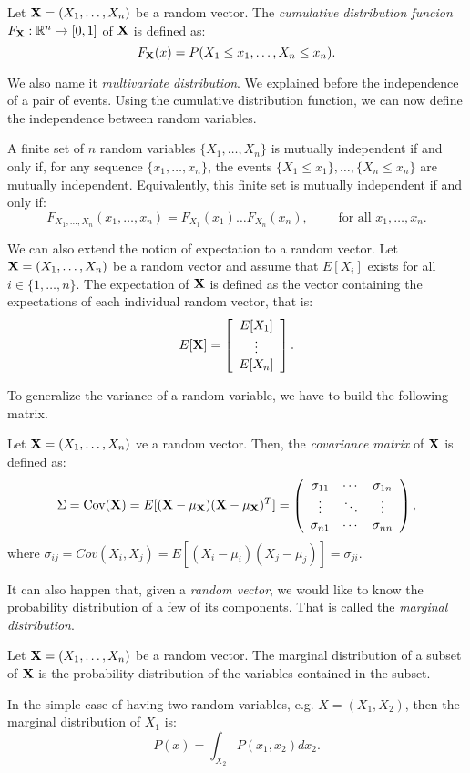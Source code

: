 \begin{ndef}
Let $\mathbf{X} = (X_1,\dots,X_n)$ be a random vector. The \emph{cumulative distribution funcion} $F_{\mathbf{X}} : \mathbb{R}^n \to [0,1]$ of $\mathbf{X}$ is defined as:
$$
F_{\mathbf{X}}(x) = P(X_1 \leq x_1 , \dots, X_n \leq x_n).
$$
\end{ndef}

We also name it \emph{multivariate distribution}.  We explained before the independence of a pair of events. Using the cumulative distribution function, we can now define the independence between random variables.
\begin{ndef}
A finite set of $n$ random variables $\{X_1,\dots,X_n\}$ is mutually independent if and only if, for any sequence $\{x_1,\dots,x_n\}$, the events $\{X_1 \leq x_1\}, \dots, \{X_n \leq x_n\}$ are mutually independent. 
Equivalently, this finite set is mutually independent if and only if:
$$
F_{X_1,\dots, X_n}(x_1,\dots,x_n) = F_{X_1}(x_1) \dots F_{X_n}(x_n), \quad \quad \text{ for all } x_1,\dots,x_n.
$$
\end{ndef}


We can also extend the notion of expectation to a random vector. Let $\mathbf{X} = (X_1,\dots,X_n)$ be a random vector and assume that $E[X_i]$ exists for all $i \in \{1, \dots, n \}$. The expectation of $\mathbf{X}$ is defined as the vector containing the expectations of each individual random vector, that is:
$$
E[\mathbf{X}] = \left[ \begin{array}{c} 
E[X_1]\\
\vdots\\
E[X_n]
\end{array} \right].
$$

To generalize the variance of a random variable, we have to build the following matrix.

\begin{ndef}
Let $\mathbf{X} = (X_1,\dots,X_n)$ ve a random vector. Then, the \emph{covariance matrix} of $\mathbf{X}$ is defined as:
$$
\Sigma = \operatorname*{Cov}(\mathbf{X}) = E[(\mathbf{X} - \mu_{\mathbf{X}})(\mathbf{X} - \mu_{\mathbf{X}})^T] = \left ( \begin{array}{ccc} 
  \sigma_{11} & \cdots & \sigma_{1n}\\
  \vdots & \ddots & \vdots \\
  \sigma_{n1} & \cdots & \sigma_{nn}
  \end{array} \right ),
$$
where $\sigma_{ij} = Cov(X_i,X_j) = E[(X_i - \mu_i)(X_j - \mu_j)] = \sigma_{ji}$.
\end{ndef}


It can also happen that, given a \emph{random vector}, we would like to know the probability distribution of a few of its components. That is called the \emph{marginal distribution}.

\begin{ndef}
Let $\mathbf{X} = (X_1,\dots,X_n)$ be a random vector. The marginal distribution of a subset of $\mathbf{X}$ is the probability distribution of the variables contained in the subset. 
\end{ndef}
In the simple case of having two random variables, e.g. $X= (X_1, X_2)$, then the marginal distribution of $X_1$ is:
$$
P(x) = \int_{X_2} P(x_1,x_2) dx_2.
$$

